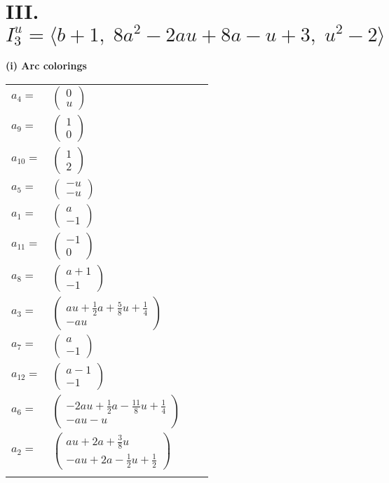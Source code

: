 \documentclass[1p]{elsarticle_modified}
\theoremstyle{definition}
\begin{document}
\centering \section*{III. $I^u_{3}= \langle b+1,\;8 a^2-2 a u+8 a- u+3,\;u^2-2 \rangle$}
\flushleft \textbf{(i) Arc colorings}\\
\begin{tabular}{m{7pt} m{180pt} m{7pt} m{180pt} }
\flushright $a_{4}=$&$\begin{pmatrix}0\\u\end{pmatrix}$ \\
\flushright $a_{9}=$&$\begin{pmatrix}1\\0\end{pmatrix}$ \\
\flushright $a_{10}=$&$\begin{pmatrix}1\\2\end{pmatrix}$ \\
\flushright $a_{5}=$&$\begin{pmatrix}- u\\- u\end{pmatrix}$ \\
\flushright $a_{1}=$&$\begin{pmatrix}a\\-1\end{pmatrix}$ \\
\flushright $a_{11}=$&$\begin{pmatrix}-1\\0\end{pmatrix}$ \\
\flushright $a_{8}=$&$\begin{pmatrix}a+1\\-1\end{pmatrix}$ \\
\flushright $a_{3}=$&$\begin{pmatrix}a u+\frac{1}{2} a+\frac{5}{8} u+\frac{1}{4}\\- a u\end{pmatrix}$ \\
\flushright $a_{7}=$&$\begin{pmatrix}a\\-1\end{pmatrix}$ \\
\flushright $a_{12}=$&$\begin{pmatrix}a-1\\-1\end{pmatrix}$ \\
\flushright $a_{6}=$&$\begin{pmatrix}-2 a u+\frac{1}{2} a-\frac{11}{8} u+\frac{1}{4}\\- a u- u\end{pmatrix}$ \\
\flushright $a_{2}=$&$\begin{pmatrix}a u+2 a+\frac{3}{8} u\\- a u+2 a-\frac{1}{2} u+\frac{1}{2}\end{pmatrix}$\\&\end{tabular}
\end{document}
